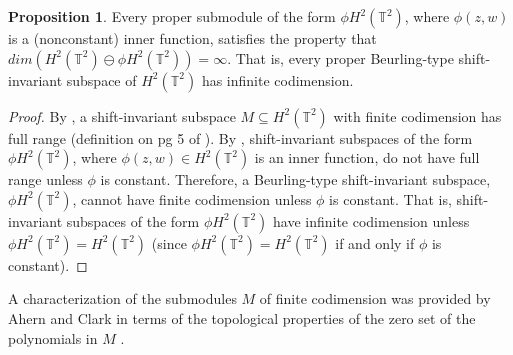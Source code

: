\documentclass[12pt,reqno]{amsart}
\theoremstyle{definition}
\theoremstyle{definition}
\newtheorem{proposition}[theorem]{Proposition}
\numberwithin{equation}{section}
\begin{document}
\begin{proposition}\label{infcodim}
Every proper submodule of the form $\phi H^2(\mathbb{T}^2)$, where $\phi(z, w)$ is a (nonconstant) inner function, satisfies the property that $dim(H^2(\mathbb{T}^2) \ominus \phi H^2(\mathbb{T}^2)) = \infty$. That is, every proper Beurling-type shift-invariant subspace of $H^2(\mathbb{T}^2)$ has infinite codimension.
\end{proposition}
\begin{proof}
By \cite{ACD86}, a shift-invariant subspace $M \subseteq H^2(\mathbb{T}^2)$ with finite codimension has full range (definition on pg 5 of \cite{ACD86}). By \cite{M88}, shift-invariant subspaces of the form $\phi H^2(\mathbb{T}^2)$, where $\phi(z, w)\in H^2(\mathbb{T}^2)$ is an inner function, do not have full range unless $\phi$ is constant. Therefore, a Beurling-type shift-invariant subspace, $\phi H^2(\mathbb{T}^2)$, cannot have finite codimension unless $\phi$ is constant. That is, shift-invariant subspaces of the form $\phi H^2(\mathbb{T}^2)$  have infinite codimension unless $\phi H^2(\mathbb{T}^2) = H^2(\mathbb{T}^2)$ (since $\phi H^2(\mathbb{T}^2) = H^2(\mathbb{T}^2)$ if and only if $\phi$ is constant).
\end{proof}
A characterization of the submodules $M$ of finite codimension was provided by Ahern and Clark in terms of the topological properties of the zero set of the polynomials in $M$ \cite{Y18}.

\end{document}
